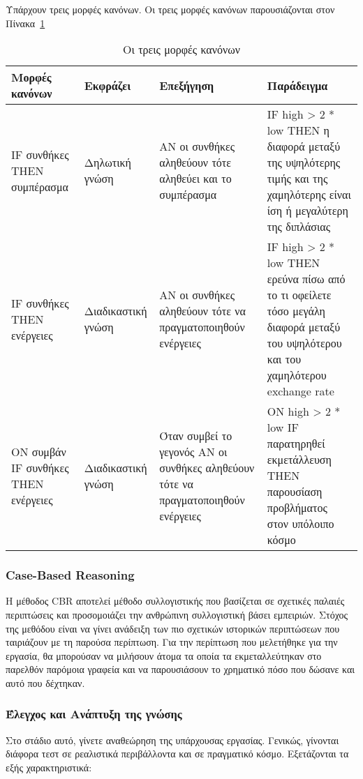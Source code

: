 Υπάρχουν τρεις μορφές κανόνων. Οι τρεις μορφές κανόνων παρουσιάζονται στον Πίνακα~\ref{tab:rules}

\begin{table}[H]
  \centering
  \begin{tabular}{| p{3cm} | p{3cm} | p{4cm} | p{5cm} |}
    \hline
    \textbf{Μορφές κανόνων} & \textbf{Εκφράζει} & \textbf{Επεξήγηση} & \textbf{Παράδειγμα} \\
    \hline
    IF συνθήκες THEN συμπέρασμα & Δηλωτική γνώση & ΑΝ οι συνθήκες αληθεύουν τότε αληθεύει και το συμπέρασμα & IF high > 2 * low THEN η διαφορά μεταξύ της υψηλότερης τιμής και της χαμηλότερης είναι ίση ή μεγαλύτερη της διπλάσιας \\
    \hline
    IF συνθήκες THEN ενέργειες & Διαδικαστική γνώση & ΑΝ οι συνθήκες αληθεύουν τότε να πραγματοποιηθούν ενέργειες & IF high > 2 * low THEN ερεύνα πίσω από το τι οφείλετε τόσο μεγάλη διαφορά μεταξύ του υψηλότερου και του χαμηλότερου exchange rate \\
    \hline
    ON συμβάν IF συνθήκες THEN ενέργειες & Διαδικαστική γνώση & Όταν συμβεί το γεγονός ΑΝ οι συνθήκες αληθεύουν τότε να πραγματοποιηθούν ενέργειες & ON high > 2 * low IF παρατηρηθεί εκμετάλλευση THEN παρουσίαση προβλήματος στον υπόλοιπο κόσμο \\
    \hline
  \end{tabular}
  \caption{Οι τρεις μορφές κανόνων}
  \label{tab:rules}
\end{table}

\subsubsection*{Case-Based Reasoning}

Η μέθοδος CBR αποτελεί μέθοδο συλλογιστικής που βασίζεται σε σχετικές παλαιές περιπτώσεις και προσομοιάζει την ανθρώπινη συλλογιστική βάσει εμπειριών. Στόχος της μεθόδου είναι να γίνει ανάδειξη των πιο σχετικών ιστορικών περιπτώσεων που ταιριάζουν με τη παρούσα περίπτωση. Για την περίπτωση που μελετήθηκε για την εργασία, θα μπορούσαν να μιλήσουν άτομα τα οποία τα εκμεταλλεύτηκαν στο παρελθόν παρόμοια γραφεία και να παρουσιάσουν το χρηματικό πόσο που δώσανε και αυτό που δέχτηκαν.

\subsubsection{Έλεγχος και Ανάπτυξη της γνώσης}

Στο στάδιο αυτό, γίνετε αναθεώρηση της υπάρχουσας εργασίας. Γενικώς, γίνονται διάφορα τεστ σε ρεαλιστικά περιβάλλοντα και σε πραγματικό κόσμο. Εξετάζονται τα εξής χαρακτηριστικά:

